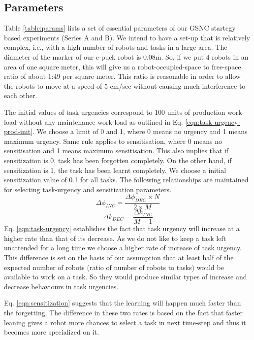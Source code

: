 \documentclass[smallcondensed]{svjour3}
\begin{document}
\subsection{Parameters}
Table \ref{table:params} lists a set of essential parameters of our GSNC startegy based experiments (Series A and B). We intend to have a set-up that is relatively complex, i.e., with a high number of robots and tasks in a large area. The diameter of the marker of our e-puck robot is 0.08m. So, if we put 4 robots in an area of one square meter, this will give us a robot-occupied-space to free-space ratio of about 1:49 per square meter. This ratio is reasonable in order to allow the robots to move at a speed of 5 cm/sec without causing much interference to each other. 

The initial values of task urgencies correspond to 100 units of production work-load without any maintenance work-load as outlined in Eq. \ref{eqn:task-urgency-prod-init}. We choose a limit of 0 and 1, where 0 means no urgency and 1 means maximum urgency. Same rule applies to sensitisation, where 0 means no sensitisation and 1 means maximum sensitisation. This also implies that if sensitization is 0, task has been forgotten completely. On the other hand, if sensitization is 1, the task has been learnt completely. We choose a initial sensitization value of 0.1 for all tasks. The following relationships are maintained for selecting task-urgency and sensitization parameters.
\begin{equation}
\Delta\phi_{INC} = \frac{\Delta\phi_{DEC} \times N}{2 \times M}
\label{eqn:task-urgency}
\end{equation}
%
\begin{equation}
\Delta k_{DEC} = \frac{\Delta k_{INC}} {M - 1} 
\label{eqn:sensitization}
\end{equation}
%
Eq. \ref{eqn:task-urgency} establishes the fact that task urgency will increase at a higher rate than that of its decrease. As we do not like to keep a task left unattended for a long time we choose a higher rate of increase of task urgency. This difference is set on the basis of our assumption that at least half of the expected number of robots (ratio of number of robots to tasks) would be available to work on a task. So they would produce similar types of increase and decrease behaviours in task urgencies.

Eq. \ref{eqn:sensitization} suggests that the learning will happen much faster than the forgetting. The difference in these two rates is based on the fact that faster leaning gives a robot more chances to select a task in next time-step and thus it becomes more specialized on it.
\end{document}
